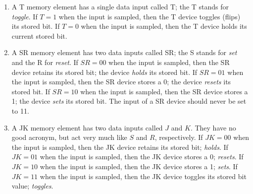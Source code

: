 \begin{enumerate}
\begin{enumerate}
\item 
{}
A T memory element has a single data input called T;
the T stands for \textit{ toggle}.  If $T=1$ when the input
is sampled, then the T device toggles (flips) its stored bit.
If $T=0$ when the input is sampled, then the T device holds its 
current stored bit.

\item 
{}
A SR memory element has two data inputs called SR;
the S stands for \textit{ set} and the R for \textit{ reset}.
If $SR=00$ when the input is sampled, then the SR device retains
its stored bit; the device \textit{ holds} its stored bit.
If $SR=01$ when the input is sampled, then the SR device stores a 0;
the device \textit{ resets} its stored bit.
If $SR=10$ when the input is sampled, then the SR device stores a 1;
the device \textit{ sets} its stored bit.
The input of a SR device should never be set to 11.

\item 
{}
A JK memory element has two data inputs called $J$ and $K$. They have
no good acronym, but act very much like $S$ and $R$, respectively.
If $JK=00$ when the input is sampled, then the JK device retains
its stored bit; \textit{ holds}.
If $JK=01$ when the input is sampled, then the JK device stores a 0; \textit{ resets}.
If $JK=10$ when the input is sampled, then the JK device stores a 1; \textit{ sets}.
If $JK=11$ when the input is sampled, then the JK device toggles its
stored bit value; \textit{ toggles}.
\end{enumerate}
\end{enumerate}

